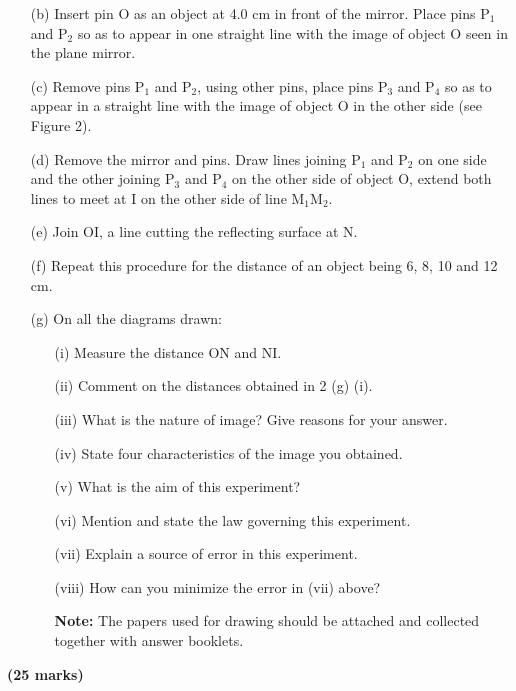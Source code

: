 \begin{enumerate}
\begin{enumerate}
\item[(b)] Insert pin O as an object at 4.0 cm in front of the mirror. Place pins P$_1$ and P$_2$ so as to appear in one straight line with the image of object O seen in the plane mirror.
\item[(c)] Remove pins P$_1$ and P$_2$, using other pins, place pins P$_3$ and P$_4$ so as to appear in a straight line with the image of object O in the other side (see Figure 2).
\item[(d)] Remove the mirror and pins. Draw lines joining P$_1$ and P$_2$ on one side and the other joining P$_3$ and P$_4$ on the other side of object O, extend both lines to meet at I on the other side of line M$_1$M$_2$.
\item[(e)] Join OI, a line cutting the reflecting surface at N.
\item[(f)] Repeat this procedure for the distance of an object being 6, 8, 10 and 12 cm.
\item[(g)] On all the diagrams drawn:
\begin{enumerate}
\item[(i)] Measure the distance ON and NI.
\item[(ii)] Comment on the distances obtained in 2 (g) (i).
\item[(iii)] What is the nature of image? Give reasons for your answer.
\item[(iv)] State four characteristics of the image you obtained.
\item[(v)] What is the aim of this experiment?
\item[(vi)] Mention and state the law governing this experiment.
\item[(vii)] Explain a source of error in this experiment.
\item[(viii)] How can you minimize the error in (vii) above?\\

\item[] \textbf{Note:} The papers used for drawing should be attached and collected together with answer booklets.
\end{enumerate}
\end{enumerate}
\end{enumerate}
\flushright \textbf{(25 marks)}
\flushleft